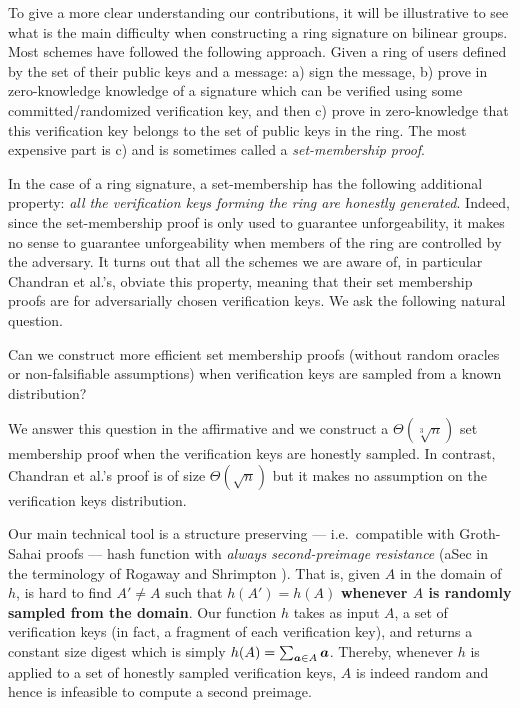 
To give a more clear understanding our contributions, it will be illustrative to see what is the main difficulty when constructing a ring signature on bilinear groups. Most schemes have followed the following approach. Given a ring of users defined by the set of their public keys and a message: a) sign the message, b) prove in zero-knowledge knowledge of a signature which can be verified using some committed/randomized verification key, and then c) prove in zero-knowledge that this verification key belongs to the set of public keys in the ring.  The most expensive part is c) and is sometimes called a \emph{set-membership proof}.

In the case of a ring signature, a set-membership has the following additional property: \emph{all the verification keys forming the ring are honestly generated}. 
Indeed, since the set-membership proof is only used to guarantee unforgeability, it makes no sense to guarantee unforgeability when members of the ring are controlled by the adversary.
It turns out that all the schemes we are aware of, in particular Chandran et al.'s, obviate this property, meaning that their set membership proofs are for adversarially chosen verification keys.
We ask the following natural question.
\begin{displayquote}
Can we construct more efficient set membership proofs (without random oracles or non-falsifiable assumptions) when verification keys are sampled from a known distribution?
\end{displayquote}
We answer this question in the affirmative and we construct a $\Theta(\sqrt[3]{n})$ set membership proof when the verification keys are honestly sampled. In contrast, Chandran et al.'s proof is of size $\Theta(\sqrt{n})$ but it makes no assumption on the verification keys distribution.

Our main technical tool is a structure preserving --- i.e.~compatible with Groth-Sahai proofs --- hash function with \emph{always second-preimage resistance} (aSec in the terminology of Rogaway and Shrimpton \cite{FSE:RogShr04}). That is, given $A$ in the domain of $h$, is hard to find $A'\neq A$ such that $h(A')=h(A)$ {\bf whenever $A$ is randomly sampled from the domain}.
Our function $h$ takes as input $A$, a set of verification keys (in fact, a fragment of each verification key), and returns a constant size digest which is simply $h(A)= \sum_{{\boldsymbol{a}} \in A} {\boldsymbol{a}}$. Thereby, whenever $h$ is applied to a set of honestly sampled verification keys, $A$ is indeed random and hence is infeasible to compute a second preimage.

